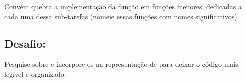 Convém quebra a implementação da função  em funções menores, dedicadas a cada uma dessa
sub-tarefas (nomeie essas funções com nomes significativos).

\subsection*{Desafio:}
Pesquise sobre  e incorpore-os na representação de  para deixar o código mais
legível e organizado.